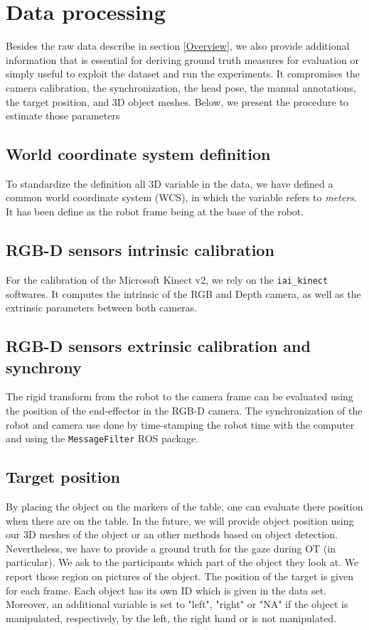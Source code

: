 \documentclass[11pt,a4paper]{article}
\begin{document}
\section{Data processing}
\label{Data_Processing}
Besides the raw data describe in section \ref{Overview}, we also provide additional information that is essential for deriving ground truth measures for evaluation or simply useful to exploit the dataset and run the experiments. It compromises the camera calibration, the synchronization, the head pose, the manual annotations, the target position, and 3D object meshes. Below, we present the procedure to estimate those parameters

\subsection{World coordinate system definition}
To standardize the definition all 3D variable in the data, we have defined a common world coordinate system (WCS), in which the variable refers to \textit{meters}. It has been define as the robot frame being at the base of the robot.

\subsection{RGB-D sensors intrinsic calibration}
For the calibration of the Microsoft Kinect v2, we rely on the \texttt{iai\_kinect} softwares. It computes the intrinsic of the RGB and Depth camera, as well as the extrinsic parameters between both cameras.

\subsection{RGB-D sensors extrinsic calibration and synchrony}
The rigid transform from the robot to the camera frame can be evaluated using the position of the end-effector in the RGB-D camera. The synchronization of the robot and camera use done by time-stamping the robot time with the computer and using the \texttt{MessageFilter} ROS package.

\subsection{Target position}
By placing the object on the markers of the table, one can evaluate there position when there are on the table. In the future, we will provide object position using our 3D meshes of the object or an other methods based on object detection. Nevertheless, we have to provide a ground truth for the gaze during OT (in particular). We ask to the participants which part of the object they look at. We report those region on pictures of the object. The position of the target is given for each frame. Each object has its own ID which is given in the data set. Moreover, an additional variable is set to "left", "right" or "NA" if the object is manipulated, respectively, by the left, the right hand or is not manipulated.
\end{document}
